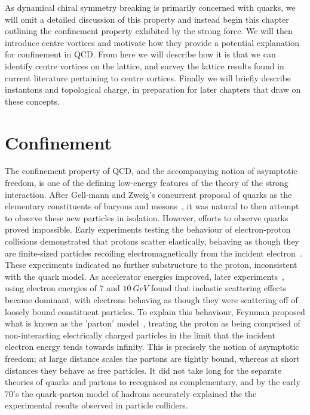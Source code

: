 As dynamical chiral symmetry breaking is primarily concerned with quarks, we will omit a detailed discussion of this property and instead begin this chapter outlining the confinement property exhibited by the strong force. We will then introduce centre vortices and motivate how they provide a potential explanation for confinement in QCD. From here we will describe how it is that we can identify centre vortices on the lattice, and survey the lattice results found in current literature pertaining to centre vortices. Finally we will briefly describe instantons and topological charge, in preparation for later chapters that draw on these concepts.  

\section{Confinement}\label{sec:Confinement}
The confinement property of QCD, and the accompanying notion of asymptotic freedom, is one of the defining low-energy features of the theory of the strong interaction. After Gell-mann and Zweig's concurrent proposal of quarks as the elementary constituents of baryons and mesons~\cite{GellMann:1964nj,Zweig:1964jf}, it was natural to then attempt to observe these new particles in isolation. However, efforts to observe quarks proved impossible. Early experiments testing the behaviour of electron-proton collisions demonstrated that protons scatter elastically, behaving as though they are finite-sized particles recoiling electromagnetically from the incident electron~\cite{Hofstadter:1956qs}. These experiments indicated no further substructure to the proton, inconsistent with the quark model. As accelerator energies improved, later experiments~\cite{Bloom:1969kc, Breidenbach:1969kd}, using electron energies of $7$ and $10~\si{GeV}$ found that inelastic scattering effects became dominant, with electrons behaving as though they were scattering off of loosely bound constituent particles. To explain this behaviour, Feynman proposed what is known as the 'parton' model~\cite{Feynman:1969ej}, treating the proton as being comprised of non-interacting electrically charged particles in the limit that the incident electron energy tends towards infinity. This is precisely the notion of asymptotic freedom; at large distance scales the partons are tightly bound, whereas at short distances they behave as free particles. It did not take long for the separate theories of quarks and partons to recognised as complementary, and by the early 70's the quark-parton model of hadrons accurately explained the the experimental results observed in particle colliders.\\


